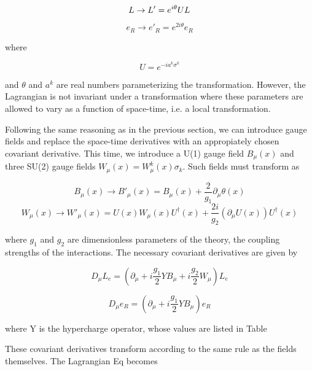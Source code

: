 \begin{equation}
L\rightarrow L' = e^{i\theta}UL\\
\end{equation}

\begin{equation}
e_{R}\rightarrow e'_{R} = e^{2i\theta}e_{R}
\end{equation}

where

\begin{equation}
U = e^{-ia^{k}\sigma^{k}}
\end{equation}

and $\theta$ and $a^{k}$ are real numbers parameterizing the transformation. However, the Lagrangian is not invariant under a transformation where these parameters are allowed to vary as a function of space-time, i.e. a local transformation.

Following the same reasoning as in the previous section, we can introduce gauge fields and replace the space-time derivatives with an appropiately chosen covariant derivative. This time, we introduce a U(1) gauge field $B_{\mu}(x)$ and three SU(2) gauge fields $W_{\mu}(x)= W_{\mu}^{k}(x)\sigma_{k}$. Such fields must transform as

\begin{equation}
B_{\mu}(x)\rightarrow B'_{\mu}(x) = B_{\mu}(x) + \frac{2}{g_{1}}\partial_{\mu}\theta(x)
\end{equation}
\begin{equation}
W_{\mu}(x)\rightarrow W'_{\mu}(x) = U(x)W_{\mu}(x)U^{\dagger}(x) + \frac{2i}{g_{2}}(\partial_{\mu}U(x))U^{\dagger}(x)
\end{equation}

where $g_{1}$ and $g_{2}$ are dimensionless parameters of the theory, the coupling strengths of the interactions. The necessary covariant derivatives are given by

\begin{equation}
D_{\mu}L_{e} = (\partial_{\mu}+i\frac{g_{1}}{2}YB_{\mu}+i\frac{g_{2}}{2}W_{\mu})L_{e}
\end{equation}

\begin{equation}
D_{\mu}e_{R} = (\partial_{\mu}+i\frac{g_{1}}{2}YB_{\mu})e_{R}
\end{equation}
 
 where Y is the hypercharge operator, whose values are listed in Table 

 These covariant derivatives transform according to the same rule as the fields themselves. The Lagrangian Eq becomes

